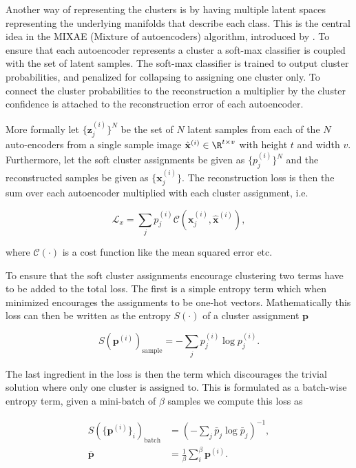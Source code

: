Another way of representing the clusters is by having multiple latent spaces representing the underlying manifolds that describe each class. This is the central idea in the MIXAE (Mixture of autoencoders) algorithm, introduced by  \cite{Zhang}. To ensure that each autoencoder represents a cluster a soft-max classifier is coupled with the set of latent samples. The soft-max classifier is trained to output cluster probabilities, and penalized for collapsing to assigning one cluster only. To connect the cluster probabilities to the reconstruction a multiplier by the cluster confidence is attached to the reconstruction error of each autoencoder.

More formally let $\{\mathbf{z}_j^{(i)}\}^N$ be the set of $N$ latent samples from each of the $N$ auto-encoders from a single sample image $\hat{\mathbf{x}}^{(i)} \in \R ^{t\times v}$ with height $t$ and width $v$. Furthermore, let the soft cluster assignments be given as $\{p_j^{(i)}\}^N$ and the reconstructed samples be given as $\{\mathbf{x}_j^{(i)}\}$. The reconstruction loss is then the sum over each autoencoder multiplied with each cluster assignment, i.e.

\begin{equation}\label{eq:mixae_reconst}
\mathcal{L}_x = \sum_j p_j^{(i)} \mathcal{C}(\mathbf{x}_j^{(i)}, \hat{\mathbf{x}}^{(i)}),
\end{equation}

\noindent where $\mathcal{C}(\cdot)$ is a cost function like the mean squared error etc. 

To ensure that the soft cluster assignments encourage clustering two terms have to be added to the total loss. The first is a simple entropy term which when minimized encourages the assignments to be one-hot vectors. Mathematically this loss can then be written as the entropy $S(\cdot)$ of a cluster assignment $\mathbf{p}$

\begin{equation}\label{eq:mixae_sample}
S(\mathbf{p}^{(i)})_{\text{sample}} = -\sum_j p_j^{(i)} \log p_j^{(i)}. 
\end{equation}

\noindent The last ingredient in the loss is then the term which discourages the trivial solution where only one cluster is assigned to. This is formulated as a batch-wise entropy term, given a mini-batch of $\beta$ samples we compute this loss as 

\begin{equation}\label{eq:mixae_batch}
\begin{split}
S(\{\mathbf{p}^{(i)}\}_i)_{\text{batch}}&= \left(-\sum_j \bar{p}_j \log \bar{p}_j \right)^{-1},\\
\bar{\mathbf{p}} &= \frac{1}{\beta} \sum_i ^\beta \mathbf{p}^{(i)} .
\end{split}
\end{equation}

